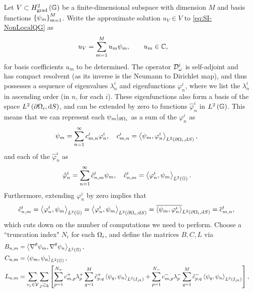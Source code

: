 Let $V\subset H^2_\mathrm{grad}\left( \mathbb{G} \right)$ be a finite-dimensional subspace with dimension $M$ and basis functions $\left\{ \psi_m \right\}_{m=1}^{M}$.
Write the approximate solution $u_V\in V$ to \eqref{eq:SI-NonLocalQG} as
\begin{align*}
	u_V &= \sum_{m=1}^M u_m\psi_m, \qquad u_m\in\mathbb{C},
\end{align*}
for basis coefficients $u_m$ to be determined.
The operator $\mathcal{D}_{\omega}^i$ is self-adjoint and has compact resolvent (as its inverse is the Neumann to Dirichlet map), and thus possesses a sequence of eigenvalues $\lambda^i_n$ and eigenfunctions $\varphi_n^i$, where we list the $\lambda^i_n$ in ascending order (in $n$, for each $i$).
These eigenfunctions also form a basis of the space $L^{2}\left( \partial\Omega_i,\mathrm{d}S \right)$, and can be extended by zero to functions $\hat{\varphi}_n^i$ in $L^2\left( \mathbb{G} \right)$.
This means that we can represent each $\psi_m\vert_{\partial\Omega_i}$ as a sum of the $\varphi_n^i$ as
\begin{align*}
	\psi_m = \sum_{n=1}^{\infty} c_{m,n}^i \varphi_n^i, \quad c_{m,n}^i = \left\langle \psi_m , \varphi_n^i \right\rangle_{L^{2}\left( \partial\Omega_i,\mathrm{d}S \right)},
\end{align*}
and each of the $\hat{\varphi}_n^i$ as
\begin{align*}
	\hat{\varphi}_n^i = \sum_{n=1}^{\infty} \hat{c}_{n,m}^i \psi_m, \quad \hat{c}_{n,m}^i = \left\langle \varphi_n^i , \psi_m \right\rangle_{L^2\left( \mathbb{G} \right)}.
\end{align*}
Furthermore, extending $\varphi_n^i$ by zero implies that
\begin{align*}
	\hat{c}_{n,m}^i = \left\langle \varphi_n^i , \psi_m \right\rangle_{L^2\left( \mathbb{G} \right)} = \left\langle \varphi_n^i , \psi_m \right\rangle_{L^{2}\left( \partial\Omega_i,\mathrm{d}S \right)} = \overline{\left\langle \psi_m , \varphi_n^i \right\rangle}_{L^{2}\left( \partial\Omega_i,\mathrm{d}S \right)} = \overline{c}_{m,n}^i,
\end{align*}
which cuts down on the number of computations we need to perform.
Choose a ``truncation index" $N_i$ for each $\Omega_i$, and define the matrices $B, C, L$ via
\begin{align*}
	B_{n,m} &= \ip{\tgrad\psi_m}{\tgrad\psi_n}_{L^2\bracs{\graph}}, \\
	C_{n,m} &= \ip{\psi_m}{\psi_n}_{L^2\bracs{\graph}}, \\
	L_{n,m} &= \sum_{v_j\in\vertSet}\sum_{j\conLeft k}
	\sqbracs{ \sum_{p=1}^{N_+}c_{m,p}^+\lambda^+_p \sum_{q=1}^M \hat{c}_{p,q}^+ \ip{\psi_q}{\psi_n}_{L^2\bracs{I_{jk}}} + \sum_{p=1}^{N_-}c_{m,p}^-\lambda^-_p \sum_{q=1}^M \hat{c}_{p,q}^- \ip{\psi_q}{\psi_n}_{L^2\bracs{I_{jk}}} },
\end{align*}

